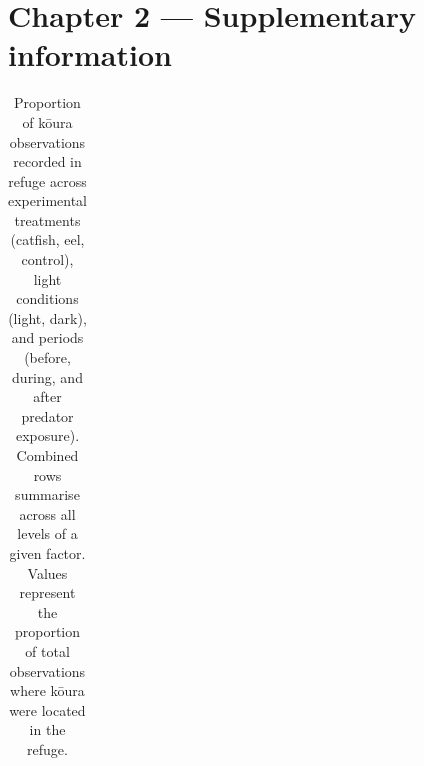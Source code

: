 \documentclass[
  12pt,
  a4paper,
  oneside]{scrbook}
\begin{document}
\section*{Chapter 2 --- Supplementary
information}\label{chapter-2-supplementary-information}

\begingroup\fontsize{9}{11}\selectfont

\begin{longtable}[t]{lllrrr}

\caption{\label{tbl-refuge-prop}Proportion of kōura observations
recorded in refuge across experimental treatments (catfish, eel,
control), light conditions (light, dark), and periods (before, during,
and after predator exposure). Combined rows summarise across all levels
of a given factor. Values represent the proportion of total observations
where kōura were located in the refuge.}

\tabularnewline


\end{longtable}
\end{document}
